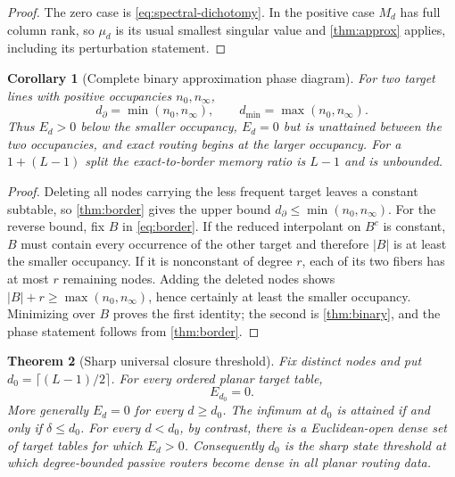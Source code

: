 \documentclass[11pt]{article}
\newtheorem{theorem}{Theorem}[section]
\newtheorem{corollary}[theorem]{Corollary}
\theoremstyle{definition}\newtheorem{definition}[theorem]{Definition}\newtheorem{example}[theorem]{Example}
\theoremstyle{remark}\newtheorem{remark}[theorem]{Remark}\newtheorem{limitation}[theorem]{Limitation}
\begin{document}
\begin{proof}
The zero case is \eqref{eq:spectral-dichotomy}.  In the positive case $M_d$
has full column rank, so $\mu_d$ is its usual smallest singular value and
\cref{thm:approx} applies, including its perturbation statement.
\end{proof}

\begin{corollary}[Complete binary approximation phase diagram]\label{cor:binary-border}
For two target lines with positive occupancies $n_0,n_\infty$,
\begin{equation}\label{eq:binary-border}
 d_\partial=\min(n_0,n_\infty),\qquad
 d_{\min}=\max(n_0,n_\infty).
\end{equation}
Thus $E_d>0$ below the smaller occupancy, $E_d=0$ but is unattained between
the two occupancies, and exact routing begins at the larger occupancy.  For a
$1+(L-1)$ split the exact-to-border memory ratio is $L-1$ and is unbounded.
\end{corollary}

\begin{proof}
Deleting all nodes carrying the less frequent target leaves a constant
subtable, so \cref{thm:border} gives the upper bound
$d_\partial\le\min(n_0,n_\infty)$.  For the reverse bound, fix $B$ in
\eqref{eq:border}.  If the reduced interpolant on $B^c$ is constant, $B$ must
contain every occurrence of the other target and therefore $|B|$ is at least
the smaller occupancy.  If it is nonconstant of degree $r$, each of its two
fibers has at most $r$ remaining nodes.  Adding the deleted nodes shows
$|B|+r\ge\max(n_0,n_\infty)$, hence certainly at least the smaller occupancy.
Minimizing over $B$ proves the first identity; the second is
\cref{thm:binary}, and the phase statement follows from \cref{thm:border}.
\end{proof}

\begin{theorem}[Sharp universal closure threshold]\label{thm:closure}
Fix distinct nodes and put $d_0=\lceil(L-1)/2\rceil$.  For every ordered
planar target table,
\begin{equation}\label{eq:closure}
                              \boxed{E_{d_0}=0}.
\end{equation}
More generally $E_d=0$ for every $d\ge d_0$.  The infimum at $d_0$ is attained
if and only if $\delta\le d_0$.  For every $d<d_0$, by contrast, there is a
Euclidean-open dense set of target tables for which $E_d>0$.  Consequently
$d_0$ is the sharp state threshold at which degree-bounded passive routers
become dense in all planar routing data.
\end{theorem}
\end{document}
